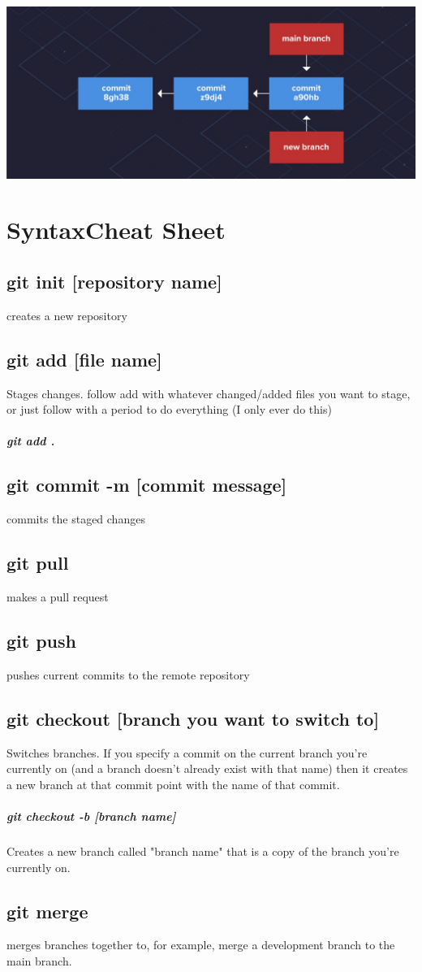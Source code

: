 \documentclass{article}
\begin{document}
\begin{center}
\includegraphics[width=\textwidth]{merge_picture.jpg}
\end{center}

\section{SyntaxCheat Sheet}
\subsection{git init [repository name]}
creates a new repository
\subsection{git add [file name]}
Stages changes. follow add with whatever changed/added files you want to stage, or just follow with a period to do everything (I only ever do this)
\subparagraph{git add .}

\subsection{git commit -m [commit message]}
commits the staged changes
\subsection{git pull}
makes a pull request
\subsection{git push}
pushes current commits to the remote repository
\subsection{git checkout [branch you want to switch to]}
Switches branches. If you specify a commit on the current branch you're currently on (and a branch doesn't already exist with that name) then it creates a new branch at that commit point with the name of that commit.
	\subparagraph{git checkout -b [branch name]}
	Creates a new branch called "branch name" that is a copy of the branch you're currently on.
\subsection{git merge}
merges branches together to, for example, merge a development branch to the main branch.
\end{document}
